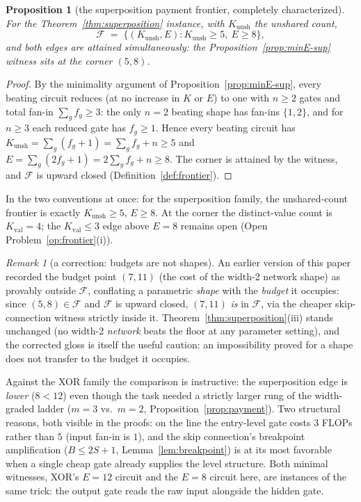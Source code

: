\documentclass[twocolumn,10pt]{article}
\newtheorem{proposition}[theorem]{Proposition}
\theoremstyle{definition}
\theoremstyle{remark}
\newtheorem{remark}[theorem]{Remark}
\newcommand{\cF}{\mathcal{F}}
\newcommand{\Kunsh}{K_{\mathrm{unsh}}}
\newcommand{\Kval}{K_{\mathrm{val}}}
\begin{document}
\begin{proposition}[the superposition payment frontier, completely
characterized]
\label{prop:frontier-sup}
For the Theorem~\ref{thm:superposition} instance, with $\Kunsh$ the
unshared count,
\[
\cF \;=\; \{(\Kunsh, E) : \Kunsh \ge 5,\ E \ge 8\},
\]
and both edges are attained simultaneously: the
Proposition~\ref{prop:minE-sup} witness sits at the corner $(5, 8)$.
\end{proposition}

\begin{proof}
By the minimality argument of Proposition~\ref{prop:minE-sup}, every
beating circuit reduces (at no increase in $K$ or $E$) to one with
$n \ge 2$ gates and total fan-in $\sum_g f_g \ge 3$: the only $n = 2$
beating shape has fan-ins $\{1, 2\}$, and for $n \ge 3$ each reduced
gate has $f_g \ge 1$. Hence every beating circuit has
$\Kunsh = \sum_g (f_g + 1) = \sum_g f_g + n \ge 5$ and
$E = \sum_g (2 f_g + 1) = 2 \sum_g f_g + n \ge 8$. The corner is
attained by the witness, and $\cF$ is upward closed
(Definition~\ref{def:frontier}).
\end{proof}

In the two conventions at once: for the superposition family, the
unshared-count frontier is exactly $\Kunsh \ge 5$, $E \ge 8$. At the
corner the distinct-value count is $\Kval = 4$; the $\Kval \le 3$ edge
above $E = 8$ remains open (Open Problem~\ref{op:frontier}(i)).

\begin{remark}[a correction: budgets are not shapes]
\label{rem:budget-correction}
An earlier version of this paper recorded the budget point $(7, 11)$
(the cost of the width-2 network shape) as provably outside
$\cF$, conflating a parametric \emph{shape} with the \emph{budget} it
occupies: since $(5, 8) \in \cF$ and $\cF$ is upward closed, $(7, 11)$
\emph{is} in $\cF$, via the cheaper skip-connection witness strictly
inside it. Theorem~\ref{thm:superposition}(iii) stands unchanged
(no width-2 \emph{network} beats the floor at any parameter setting),
and the corrected gloss is itself the useful caution: an impossibility
proved for a shape does not transfer to the budget it occupies.
\end{remark}

Against the XOR family the comparison is instructive: the superposition
edge is \emph{lower} ($8 < 12$) even though the task needed a strictly
larger rung of the width-graded ladder ($m = 3$ vs.\ $m = 2$,
Proposition~\ref{prop:payment}). Two structural reasons, both visible
in the proofs: on the line the entry-level gate costs $3$ FLOPs rather
than $5$ (input fan-in is $1$), and the skip connection's breakpoint
amplification ($B \le 2S + 1$, Lemma~\ref{lem:breakpoint}) is at its
most favorable when a single cheap gate already supplies the level
structure. Both minimal witnesses, XOR's $E = 12$ circuit and the
$E = 8$ circuit here, are instances of the same trick: the output
gate reads the raw input alongside the hidden gate.
\end{document}
